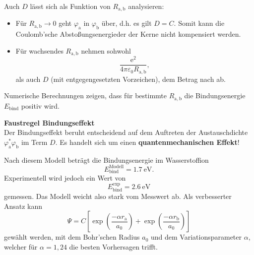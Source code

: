     Auch $D$ lässt sich als Funktion von $R_\mathrm{a,b}$ analysieren:
    \begin{itemize}
        \item Für $R_\mathrm{a,b}\to 0 $ geht $ \varphi_\mathrm{a}$ in $ \varphi_\mathrm{b}$ über, d.h. es gilt $ D= C$. Somit kann die Coulomb'sche Abstoßungsenergieder der Kerne nicht kompensiert werden.
        \item Für wachsendes $R_\mathrm{a,b}$ nehmen sohwohl
            $$
            \frac{\mathrm{e}^2}{4 \pi \varepsilon_0 R_\mathrm{a,b}}, 
            $$ 
            als auch $D$ (mit entgegengesetzten Vorzeichen), dem Betrag nach ab.
    \end{itemize}
    Numerische Berechnungen zeigen, dass für bestimmte $R_\mathrm{a,b}$ die Bindungsenergie $E_{\text{bind}}$ positiv wird.

    \begin{important}\unboldmath
        \textbf{Faustregel Bindungseffekt}\\[1ex]
        Der Bindungseffekt beruht entscheidend auf dem Auftreten der Austauschdichte $\varphi_\mathrm{a}^{*} \varphi_\mathrm{b}$ im Term $D$. 
        Es handelt sich um einen \textbf{quantenmechanischen Effekt}!
    \end{important}

    Nach diesem Modell beträgt die Bindungsenergie im Wasserstoffion  
    $$E^\mathrm{Modell}_\mathrm{bind}=\SI{1.7}{\electronvolt}.$$
    Experimentell wird jedoch ein Wert von 
    $$E^\mathrm{exp}_\mathrm{bind}=\SI{2.6}{\electronvolt}$$
    gemessen. Das Modell weicht also stark vom Messwert ab. Als verbesserter Ansatz kann
    $$\Psi = C\left[\exp\left(\frac{-\alpha r_\mathrm a}{a_0}\right) + \exp\left(\frac{-\alpha r_\mathrm b}{a_0}\right) \right]
    $$
    gewählt werden, mit dem Bohr'schen Radius $a_0$ und dem Variationsparameter $\alpha$, welcher für $\alpha=1,24$ die besten Vorhersagen trifft.
    

